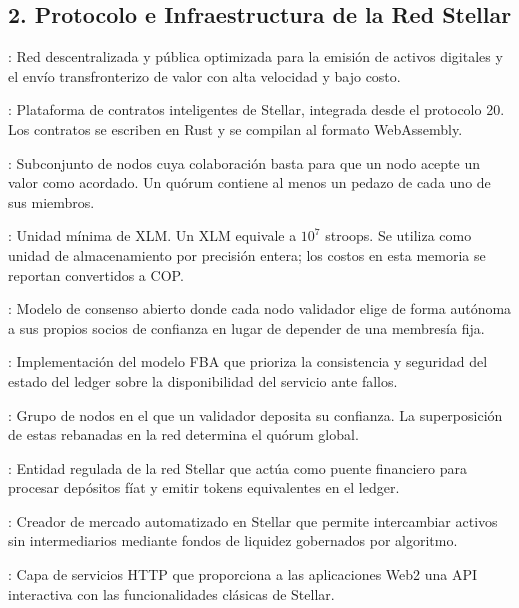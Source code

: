 \subsection*{2. Protocolo e Infraestructura de la Red Stellar}

\begin{description}\setlength{\itemsep}{2pt}
\item[Stellar]: Red descentralizada y pública optimizada para la emisión de activos digitales y el envío
transfronterizo de valor con alta velocidad y bajo costo.
\item[Soroban]: Plataforma de contratos inteligentes de Stellar, integrada desde el protocolo 20. Los
contratos se escriben en Rust y se compilan al formato WebAssembly.

\item[Quórum / \textit{Quorum slice}]: Subconjunto de nodos cuya colaboración basta para que un nodo acepte
un valor como acordado. Un quórum contiene al menos un pedazo de cada uno de sus miembros.
\item[Stroop]: Unidad mínima de XLM. Un XLM equivale a $10^{7}$ stroops. Se utiliza como unidad de
almacenamiento por precisión entera; los costos en esta memoria se reportan convertidos a COP.
\item[FBA (\textit{Federated Byzantine Agreement})]: Modelo de consenso abierto donde cada nodo validador
elige de forma autónoma a sus propios socios de confianza en lugar de depender de una membresía fija.
\item[SCP (\textit{Stellar Consensus Protocol})]: Implementación del modelo FBA que prioriza la consistencia
y seguridad del estado del ledger sobre la disponibilidad del servicio ante fallos.
\item[Rebanada de quórum (\textit{Quorum slice})]: Grupo de nodos en el que un validador deposita su
confianza. La superposición de estas rebanadas en la red determina el quórum global.
\item[Anclaje (\textit{Anchor})]: Entidad regulada de la red Stellar que actúa como puente financiero para
procesar depósitos fíat y emitir tokens equivalentes en el ledger.
\item[AMM (\textit{Automated Market Maker})]: Creador de mercado automatizado en Stellar que permite
intercambiar activos sin intermediarios mediante fondos de liquidez gobernados por algoritmo.
\item[Horizon]: Capa de servicios HTTP que proporciona a las aplicaciones Web2 una API interactiva con las
funcionalidades clásicas de Stellar.

\end{description}
